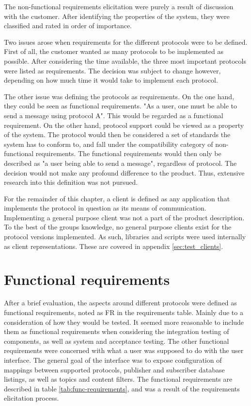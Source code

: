 The non-functional requirements elicitation were purely a result of discussion with the customer. After identifying the properties of the system, they were classified and rated in order of importance.

Two issues arose when requirements for the different protocols were to be defined. First of all, the customer wanted as many protocols to be implemented as possible. After considering the time available, the three most important protocols were listed as requirements. The decision was subject to change however, depending on how much time it would take to implement each protocol.

The other issue was defining the protocols as requirements. On the one hand, they could be seen as functional requirements. "As a user, one must be able to send a message using protocol A". This would be regarded as a functional requirement. On the other hand, protocol support could be viewed as a property of the system. The protocol would then be considered a set of standards the system has to conform to, and fall under the compatibility category of non-functional requirements. The functional requirements would then only be described as "a user being able to send a message", regardless of protocol. The decision would not make any profound difference to the product. Thus, extensive research into this definition was not pursued.

For the remainder of this chapter, a client is defined as any application that implements the protocol in question as its means of communication. Implementing a general purpose client was not a part of the product description. To the best of the groups knowledge, no general purpose clients exist for the protocol versions implemented. As such, libraries and scripts were used internally as client representations. These are covered in appendix \ref{sec:test_clients}.

\section{Functional requirements}
\label{sec:requirements_engineering-functional_requirements}

After a brief evaluation, the aspects around different protocols were defined as functional requirements, noted as FR in the requirements table. Mainly due to a consideration of how they would be tested. It seemed more reasonable to include them as functional requirements when considering the integration testing of components, as well as system and acceptance testing. The other functional requirements were concerned with what a user was supposed to do with the user interface. The general goal of the interface was to expose configuration of mappings between supported protocols, publisher and subscriber database listings, as well as topics and content filters. The functional requirements are described in table \ref{tab:func-requirements}, and was a result of the requirements elicitation process.

